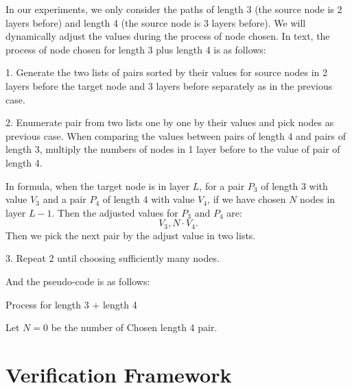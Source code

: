 \documentclass{llncs}
\begin{document}
In our experiments, we only consider the paths of length 3 (the source node is 2 layers before) and length 4 (the source node is 3 layers before). We will dynamically adjust the values during the process of node chosen. In text, the process of node chosen for length 3 plus length 4 is as follows:

\vspace*{1ex}

1. Generate the two lists of pairs sorted by their values for source nodes in 2 layers before the target node and 3 layers before separately as in the previous case.

2. Enumerate pair from two lists one by one by their values and pick nodes as previous case. When comparing the values between pairs of length 4 and pairs of length 3, multiply the numbers of nodes in 1 layer before to the value of pair of length 4.

In formula, when the target node is in layer $L$, for a pair $P_3$ of length 3 with value $V_3$ and a pair $P_4$ of length 4 with value $V_4$, if we have chosen $N$ nodes in layer $L-1$. Then the adjusted values for $P_3$ and $P_4$ are: $$V_3, N\cdot V_4.$$ Then we pick the next pair by the adjust value in two lists.

3. Repeat 2 until choosing sufficiently many nodes.

\vspace*{1ex}

And the pseudo-code is as follows:

\begin{algorithm}
	\caption{Process for length 3 + length 4}
	
	Let $N = 0$ be the number of Chosen length 4 pair.
	
\end{algorithm}


\section{Verification Framework}
\end{document}
